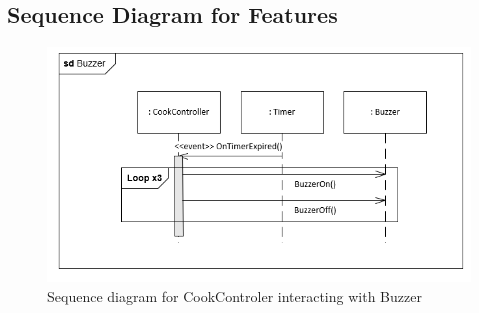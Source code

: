 \subsection{Sequence Diagram for Features}
\begin{figure}[h]
  \centering
  \includegraphics[scale=0.6]{02-Body/Image/BuzzerSEQ.PNG}
  \caption{Sequence diagram for CookControler interacting with Buzzer}%
  \label{fig:BuzzerSeq}
\end{figure}

\newpage
